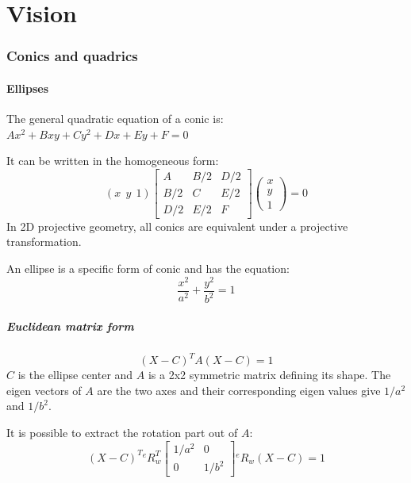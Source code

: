 \part{Vision}


\section{Conics and quadrics}

\subsection{Ellipses}
The general quadratic equation of a conic is: $Ax^2 + Bxy + Cy^2 + Dx + Ey + F = 0 $

It can be written in the homogeneous form:
\begin{equation}
(x~~y~~1) \left[\begin{array}{ccc}
     A & B/2 & D/2  \\
     B/2 & C & E/2 \\
     D/2 & E/2 & F
\end{array}\right] 
\left( \begin{array}{c}
     x  \\
     y \\
     1
\end{array} \right)
= 0
\end{equation}
In 2D projective geometry, all conics are equivalent under a projective transformation.

An ellipse is a specific form of conic and has the equation:
\begin{equation}
\frac{x^2}{a^2} + \frac{y^2}{b^2} = 1
\end{equation}

\subsubsection{Euclidean matrix form}
\begin{equation}
    (X - C)^T A (X - C) = 1
\end{equation}
$C$ is the ellipse center and $A$ is a 2x2 symmetric matrix defining its shape. The eigen vectors of $A$ are the two axes and their corresponding eigen values give $1/a^2$ and $1/b^2$.

It is possible to extract the rotation part out of $A$:
\begin{equation}
(X - C)^T {}^{e}R_{w}^T \left[ \begin{array}{cc}
    1/a^2 & 0 \\
    0 & 1/b^2
\end{array}
\right] {}^{e}R_{w} (X - C) = 1
\end{equation}

